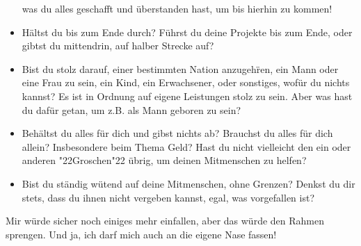 \documentclass[12pt,a5paper]{article}
\newcommand{\q}[1]{\char"22{#1}\char"22 }
\begin{document}
\begin{itemize}[nosep]
					was du alles geschafft und \"uberstanden hast,
					um bis hierhin zu kommen!
					\\
			\item	H\"altst du bis zum Ende durch?
					F\"uhrst du deine Projekte bis zum Ende,
					oder gibtst du mittendrin,
					auf halber Strecke auf?
					\\
			\item	Bist du stolz darauf,
					einer bestimmten Nation anzugeh\"ren,
					ein Mann oder eine Frau zu sein,
					ein Kind,
					ein Erwachsener,
					oder sonstiges,
					wof\"ur du nichts kannst?
					Es ist in Ordnung auf eigene Leistungen stolz zu sein.
					Aber was hast du daf\"ur getan,
					um z.B. als Mann geboren zu sein?
					\\
			\item	Beh\"altst du alles f\"ur dich und gibst nichts ab?
					Brauchst du alles f\"ur dich allein?
					Insbesondere beim Thema Geld?
					Hast du nicht vielleicht den ein oder anderen \q{Groschen} \"ubrig,
					um deinen Mitmenschen zu helfen?
					\\
			\item	Bist du st\"andig w\"utend auf deine Mitmenschen,
					ohne Grenzen?
					Denkst du dir stets,
					dass du ihnen nicht vergeben kannst,
					egal,
					was vorgefallen ist?
					\\
		\end{itemize}
		Mir w\"urde sicher noch einiges mehr einfallen,
		aber das w\"urde den Rahmen sprengen.
		Und ja,
		ich darf mich auch an die eigene Nase fassen!
		
\end{document}
